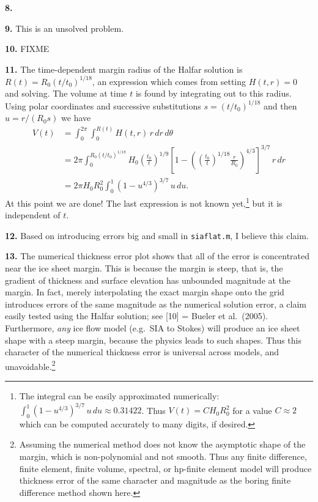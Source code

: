 \documentclass[10pt]{amsart}
\newcommand{\mfile}[1]{
\begin{quote}
\bigskip
\VerbatimInput[frame=single,label=\fbox{\normalsize \textsl{\,#1\,}},fontfamily=courier,fontsize=\footnotesize]{#1}
\end{quote}
}
\newcommand{\prob}[1]{\bigskip\noindent\large\textbf{#1.}\normalsize }
\begin{document}
\prob{8}

\mfile{verifyheat.m}

\prob{9}  This is an unsolved problem.

\prob{10}  FIXME

\prob{11}  The time-dependent margin radius of the Halfar solution is $R(t) = R_0 (t/t_0)^{1/18}$, an expression which comes from setting $H(t,r)=0$ and solving.  The volume at time $t$ is found by integrating out to this radius.  Using polar coordinates and successive substitutions $s = (t/t_0)^{1/18}$ and then $u=r/(R_0 s)$ we have
\begin{align*}
V(t) &= \int_0^{2\pi} \int_0^{R(t)} H(t,r) \,r\,dr\,d\theta \\
     &= 2\pi \int_0^{R_0 (t/t_0)^{1/18}} H_0 \left(\frac{t_0}{t}\right)^{1/9} \left[1 - \left(\left(\frac{t_0}{t}\right)^{1/18} \frac{r}{R_0}\right)^{4/3}\right]^{3/7} \,r\,dr \\
     &= 2\pi H_0 R_0^2 \int_0^1 \left(1 - u^{4/3}\right)^{3/7} \,u\,du.
\end{align*}
At this point we are done!  The last expression is not known yet,\footnote{The integral can be easily approximated numerically: $\int_0^1 (1 - u^{4/3})^{3/7} \,u\,du \approx 0.31422$.  Thus $V(t) = C H_0 R_0^2$ for a value $C\approx 2$ which can be computed accurately to many digits, if desired.} but it is independent of $t$.

\prob{12}  Based on introducing errors big and small in \texttt{siaflat.m}, I believe this claim.

\prob{13}  The numerical thickness error plot shows that all of the error is concentrated near the ice sheet margin.  This is because the margin is steep, that is, the gradient of thickness and surface elevation has unbounded magnitude at the margin.  In fact, merely interpolating the exact margin shape onto the grid introduces errors of the same magnitude as the numerical solution error, a claim easily tested using the Halfar solution; see [10] = Bueler et al.~(2005).  Furthermore, \emph{any} ice flow model (e.g.~SIA to Stokes) will produce an ice sheet shape with a steep margin, because the physics leads to such shapes.  Thus this character of the numerical thickness error is universal across models, and unavoidable.\footnote{Assuming the numerical method does not know the asymptotic shape of the margin, which is non-polynomial and not smooth.  Thus any finite difference, finite element, finite volume, spectral, or hp-finite element model will produce thickness error of the same character and magnitude as the boring finite difference method shown here.}
\end{document}
